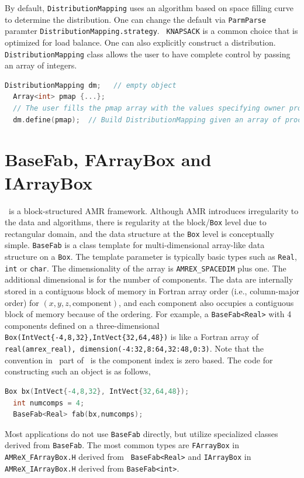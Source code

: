 {By default, {\tt DistributionMapping} uses an algorithm based on space
filling curve to determine the distribution.  One can change the default
via {\tt ParmParse} paramter {\tt DistributionMapping.strategy}.  {\tt
  KNAPSACK} is a common choice that is optimized for load balance.
One can also explicitly construct a distribution.
{\tt DistributionMapping} class allows the user to have complete control by
passing an array of integers. 
\begin{lstlisting}[language=cpp]
  DistributionMapping dm;   // empty object
  Array<int> pmap {...};
  // The user fills the pmap array with the values specifying owner processes
  dm.define(pmap);  // Build DistributionMapping given an array of process IDs.
\end{lstlisting}


\section{BaseFab, FArrayBox and IArrayBox}
\label{sec:basics:fab}

\amrex\ is a block-structured AMR framework.  Although AMR introduces
irregularity to the data and algorithms, there is regularity at the
block/{\tt Box} level due to rectangular domain, and the data structure
at the {\tt Box} level is conceptually simple.  {\tt BaseFab} is a
class template for multi-dimensional array-like data structure on a
{\tt Box}.  The template parameter is typically basic types such as
{\tt Real}, {\tt int} or {\tt char}.  The dimensionality of the array
is {\tt AMREX\_SPACEDIM} plus one.  The additional dimensional is for
the number of components.  The data are internally stored in a
contiguous block of memory in Fortran array order (i.e., column-major
order) for $(x,y,z,\mathrm{component})$, and each component also
occupies a contiguous block of memory because of the ordering.  For
example, a {\tt BaseFab<Real>} with 4 components defined on a
three-dimensional {\tt Box(IntVect\{-4,8,32\},IntVect\{32,64,48\})} is
like a Fortran array of {\tt real(amrex\_real),
  dimension(-4:32,8:64,32:48,0:3)}.  Note that the convention in \cpp\
part of \amrex\ is the component index is zero based.  The code for
constructing such an object is as follows,
\begin{lstlisting}[language=cpp]
  Box bx(IntVect{-4,8,32}, IntVect{32,64,48});
  int numcomps = 4;
  BaseFab<Real> fab(bx,numcomps);
\end{lstlisting}

Most applications do not use {\tt BaseFab} directly, but utilize
specialized classes derived from {\tt BaseFab}.  The most common types
are {\tt FArrayBox} in {\tt AMReX\_FArrayBox.H} derived from {\tt
  BaseFab<Real>} and {\tt IArrayBox} in {\tt AMReX\_IArrayBox.H}
derived from {\tt BaseFab<int>}.

}
